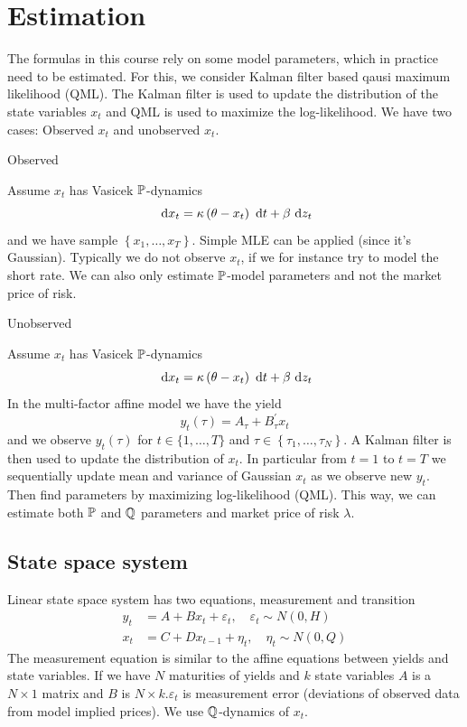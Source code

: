 \chapter{Estimation}
The formulas in this course rely on some model parameters, which in practice need to be estimated.
For this, we consider Kalman filter based qausi maximum likelihood (QML). The Kalman filter is used
to update the distribution of the state variables $x_{t}$ and QML is used to maximize the
log-likelihood. We have two cases: Observed $x_{t}$ and unobserved $x_{t}$.

\begin{description}
  \item[Observed]
\end{description}
Assume $x_{t}$ has Vasicek $\P$-dynamics
\[
\d  x_{t}=\kappa\left(\theta-x_{t}\right) \d  t+\beta \d  z_{t}
\]
and we have sample $\left\{x_{1}, \ldots, x_{T}\right\}$. Simple MLE can be applied (since it's
Gaussian). Typically we do not observe $x_{t}$, if we for instance try to model the short rate. We
can also only estimate $\P$-model parameters and not the market price of risk.

\begin{description}
  \item[Unobserved]
\end{description}
Assume $x_{t}$ has Vasicek $\P$-dynamics
\[
\d  x_{t}=\kappa\left(\theta-x_{t}\right) \d  t+\beta \d  z_{t}
\]
In the multi-factor affine model we have the yield
\[
y_{t}(\tau)=A_{\tau}+B_{\tau}^{\prime} x_{t}
\]
and we observe $y_{t}(\tau)$ for $t \in\{1, \ldots, T\}$ and $\tau \in\left\{\tau_{1}, \ldots,
\tau_{N}\right\}$. A Kalman filter is then used to update the distribution of $x_{t}$. In particular
from $t=1$ to $t=T$ we sequentially update mean and variance of Gaussian $x_{t}$ as we observe new
$y_{t}$. Then find parameters by maximizing log-likelihood (QML). This way, we can estimate both
$\P$ and $\Q$ parameters and market price of risk $\lambda$.

\section{State space system}
Linear state space system has two equations, measurement and transition
\begin{align*}
y_{t} & =A+B x_{t}+\varepsilon_{t}, \quad \varepsilon_{t} \sim N(0, H) \\
x_{t} & =C+D x_{t-1}+\eta_{t}, \quad \eta_{t} \sim N(0, Q)
\end{align*}
The measurement equation is similar to the affine equations between yields and state variables. If
we have $N$ maturities of yields and $k$ state variables $A$ is a $N \times 1$ matrix and $B$ is $N
\times k . \varepsilon_{t}$ is measurement error (deviations of observed data from model implied
prices). We use $\Q$-dynamics of $x_{t}$.

